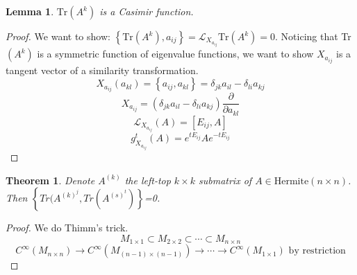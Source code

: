 \documentclass{book}
\newtheorem{theorem}{Theorem}[section]
\newtheorem{lemma}{Lemma}[section]
\theoremstyle{definition}
\begin{document}
\begin{lemma}
$\text{Tr}(A^k)$ is a Casimir function.
\end{lemma}
\begin{proof}
We want to show: $\left\{\text{Tr}(A^k),a_{ij}\right\}=\mathcal{L}_{X_{a_{ij}}}\text{Tr}(A^k)=0$. Noticing that Tr$(A^k)$ is a symmetric function of eigenvalue functions, we want to show $X_{a_{ij}}$ is a tangent vector of a similarity transformation.
\[X_{a_{ij}}(a_{kl})=\left\{a_{ij},a_{kl}\right\}=\delta_{jk}a_{il}-\delta_{li}a_{kj}\]
\[X_{a_{ij}}=(\delta_{jk}a_{il}-\delta_{li}a_{kj})\frac{\partial }{\partial a_{kl}} \]
\[\mathcal{L}_{X_{a_{ij}}}(A)=[E_{ij},A]\]
\[g^t_{X_{a_{ij}}}(A)=e^{tE_{ij}}Ae^{-tE_{ij}}\]
\end{proof}
\begin{theorem}
Denote $A^{(k)}$ the left-top $k\times k$ submatrix of $A\in\text{Hermite}(n\times n)$. Then $\left\{Tr(A^{(k)^j},Tr(A^{(s)^t})\right\}$=0.
\end{theorem}
\begin{proof}
We do Thimm's trick.
\[M_{1\times1}\subset M_{2\times2} \subset\cdots\subset M_{n\times n}\]
\[C^\infty(M_{n\times n})\longrightarrow C^\infty(M_{(n-1)\times (n-1)})\longrightarrow\cdots\longrightarrow C^\infty(M_{1\times 1})\text{ by restriction}\]
\end{proof}
\end{document}
